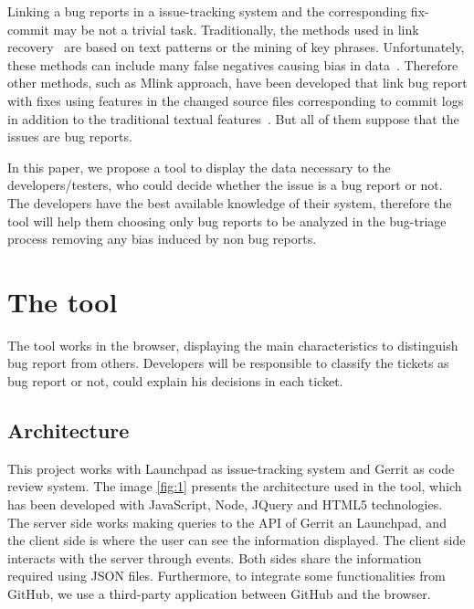 \documentclass[ifip]{svmult}
\begin{document}
Linking a bug reports in a issue-tracking system and the corresponding fix-commit may be not a trivial task. Traditionally, the methods used in link recovery~\cite{Zimmermann, Thomas} are based on text patterns or the mining of key phrases. Unfortunately, these methods can include  many false negatives causing bias in data~\cite{Bird, NguyenTH}. Therefore other methods, such as Mlink approach, have been developed that link bug report with fixes using features in the changed source files corresponding to commit logs in addition to the traditional textual features~\cite{Nguyen}. But all of them suppose that the issues are bug reports. 

In this paper, we propose a tool to display the data necessary to the developers/testers, who could decide whether the issue is a bug report or not. The developers have the best available knowledge of their system, therefore the tool will help them choosing only bug reports to be analyzed in the bug-triage process removing any bias induced by non bug reports.
	

\section{The tool} 
\label{sec:2}

The tool works in the browser, displaying the main characteristics to distinguish bug report from others. Developers will be responsible to classify the tickets as bug report or not, could explain his decisions in each ticket. 


\subsection{Architecture}

This project works with Launchpad as issue-tracking system and Gerrit as code review system. The image \ref{fig:1} presents the architecture used in the tool, which has been developed with JavaScript, Node, JQuery and HTML5 technologies. The server side works making queries to the API of Gerrit an Launchpad, and the client side is where the user can see the information displayed. The client side interacts with the server through events. Both sides share the information required using JSON files. Furthermore, to integrate some functionalities from GitHub, we use a third-party application between GitHub and the browser.
\end{document}
